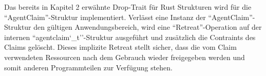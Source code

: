 Das bereits in Kapitel 2 erwähnte Drop-Trait für Rust Strukturen wird für die ``AgentClaim''-Struktur implementiert.
Verlässt eine Instanz der ``AgentClaim''-Struktur den gültigen Anwendungsbereich, wird eine ``Retreat''-Operation auf der
internen ``agentclaim\char`_t''-Struktur ausgeführt und zusätzlich die Contraints des Claims gelöscht. Dieses implizite Retreat
stellt sicher, dass die vom Claim verwendeten Ressourcen nach dem Gebrauch wieder freigegeben werden und somit anderen
Programmteilen zur Verfügung stehen.

